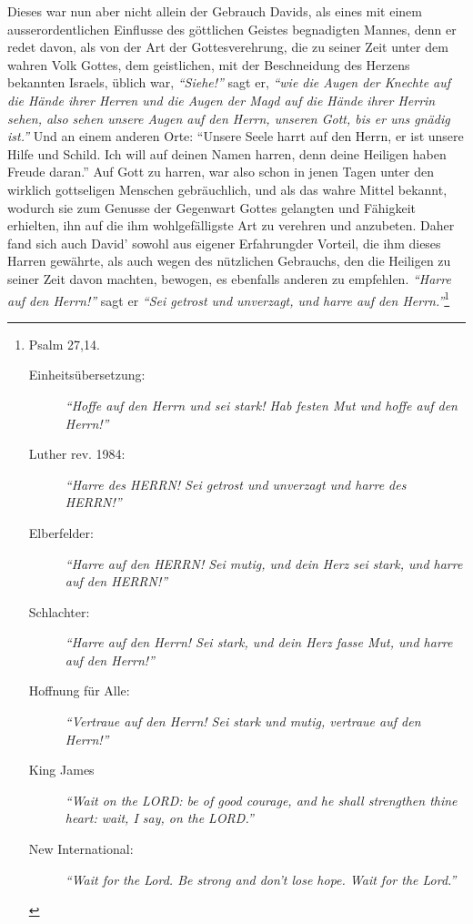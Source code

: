 \medskip

Dieses war nun aber nicht allein der Gebrauch Davids, als eines mit einem
ausserordentlichen Einflusse des göttlichen Geistes begnadigten Mannes, denn er
redet davon, als von der Art der Gottesverehrung, die zu seiner Zeit unter dem
wahren Volk Gottes, dem geistlichen, mit der
Beschneidung des Herzens bekannten
Israels, üblich war, \textit{"`Siehe!"'} sagt er,
\textit{"`wie die Augen der Knechte auf die
Hände ihrer Herren und die Augen der Magd auf die Hände ihrer
Herrin sehen,
also sehen unsere Augen auf den Herrn, unseren Gott, bis er uns gnädig
ist."'}
Und an einem anderen Orte:
"`Unsere Seele harrt auf den Herrn, er ist unsere Hilfe und Schild. Ich will
auf deinen Namen harren,
denn deine Heiligen haben Freude daran."'
Auf Gott zu harren, war also schon in jenen Tagen unter den wirklich gottseligen
Menschen gebräuchlich, und als das wahre Mittel bekannt, wodurch sie zum Genusse
der Gegenwart Gottes gelangten und Fähigkeit
erhielten, ihn auf die ihm
wohlgefälligste Art zu verehren und anzubeten. Daher fand sich auch David'
sowohl aus eigener Erfahrungder Vorteil, die ihm
dieses Harren gewährte, als
auch wegen des nützlichen Gebrauchs, den die Heiligen zu seiner Zeit davon
machten, bewogen, es ebenfalls anderen zu empfehlen.
\textit{"`Harre auf den Herrn!"'} sagt
er
\textit{"`Sei getrost und unverzagt, und harre auf den Herrn."'}\footnote{Psalm
27,14.
\begin{description}
 \item[Einheitsübersetzung:] \textit{"`Hoffe auf den Herrn und sei stark! Hab
festen Mut und hoffe auf den Herrn!"'}
 \item[Luther rev. 1984:] \textit{"`Harre des HERRN! Sei getrost und unverzagt
und harre des HERRN!"'}
 \item[Elberfelder:] \textit{"`Harre auf den HERRN! Sei mutig, und dein Herz sei
stark, und harre auf den HERRN!"'}
 \item[Schlachter:] \textit{"`Harre auf den Herrn! Sei stark, und dein Herz
fasse Mut, und harre auf den Herrn!"'}
 \item[Hoffnung für Alle:] \textit{"`Vertraue auf den Herrn! Sei stark und
mutig, vertraue auf den Herrn!"'}
 \item[King James]
\textit{ "`Wait on the LORD: be of good courage, and he shall strengthen thine
heart: wait, I say, on the LORD."'}
 \item[New International:] \textit{ "`Wait for the Lord. Be strong and don't
lose hope. Wait for the Lord."'}
 \end{description}
}
